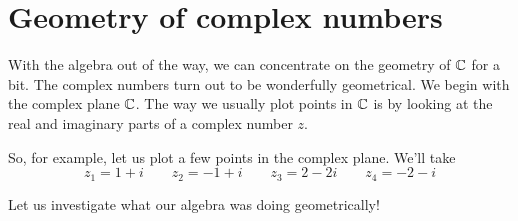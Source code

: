         \section{Geometry of complex numbers}
        
        With the algebra out of the way, we can concentrate on the geometry of $\mathbb{C}$ for a bit.  The complex numbers turn out to be wonderfully geometrical. We begin with the complex plane $\mathbb{C}$.  The way we usually plot points in $\mathbb{C}$ is by looking at the real and imaginary parts of a complex number $z$.  
        
        \begin{center}
        \end{center}
        
        So, for example, let us plot a few points in the complex plane. We'll take
        \[
        z_1=1+i \qquad z_2=-1+i \qquad z_3=2-2i \qquad z_4=-2-i
        \]
        
        \begin{center}
        \end{center}
        
        \noindent Let us investigate what our algebra was doing geometrically!\\
        
